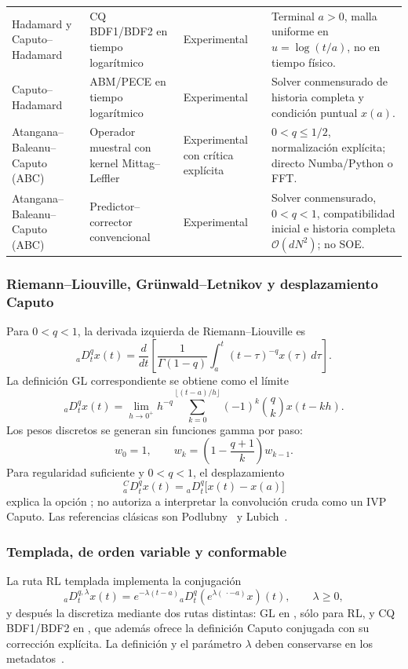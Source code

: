 \begin{center}
\begin{longtable}{@{}L{0.18\textwidth}L{0.23\textwidth}L{0.19\textwidth}L{0.29\textwidth}@{}}
Hadamard y Caputo--Hadamard & CQ BDF1/BDF2 en tiempo logarítmico & Experimental & Terminal \(a>0\), malla uniforme en \(u=\log(t/a)\), no en tiempo físico. \\
Caputo--Hadamard & ABM/PECE en tiempo logarítmico & Experimental & Solver conmensurado de historia completa y condición puntual \(x(a)\). \\
Atangana--Baleanu--Caputo (ABC) & Operador muestral con kernel Mittag--Leffler & Experimental con crítica explícita & \(0<q\le1/2\), normalización explícita; directo Numba/Python o FFT. \\
Atangana--Baleanu--Caputo (ABC) & Predictor--corrector convencional & Experimental & Solver conmensurado, \(0<q<1\), compatibilidad inicial e historia completa \(\mathcal O(dN^2)\); no SOE. \\
\bottomrule
\end{longtable}
\end{center}

\subsubsection{Riemann--Liouville, Grünwald--Letnikov y desplazamiento Caputo}

Para \(0<q<1\), la derivada izquierda de Riemann--Liouville es
\[
 {}_aD_t^q x(t)=\frac{d}{dt}
 \left[
   \frac{1}{\Gamma(1-q)}
   \int_a^t (t-\tau)^{-q}x(\tau)\,d\tau
 \right].
\]
La definición GL correspondiente se obtiene como el límite
\[
 {}_aD_t^q x(t)=\lim_{h\to0^+}h^{-q}
 \sum_{k=0}^{\lfloor (t-a)/h\rfloor}
 (-1)^k \binom{q}{k}x(t-kh).
\]
Los pesos discretos se generan sin funciones gamma por paso:
\[
 w_0=1,\qquad
 w_k=\left(1-\frac{q+1}{k}\right)w_{k-1}.
\]
Para regularidad suficiente y \(0<q<1\), el desplazamiento
\[
 {}_a^CD_t^q x(t)={}_aD_t^q\bigl[x(t)-x(a)\bigr]
\]
explica la opción ; no autoriza a interpretar la
convolución cruda como un IVP Caputo. Las referencias clásicas son
Podlubny~\cite{Podlubny1999} y Lubich~\cite{Lubich1986}.

\subsubsection{Templada, de orden variable y conformable}

La ruta RL templada implementa la conjugación
\[
 {}_aD_t^{q,\lambda}x(t)=
 e^{-\lambda(t-a)}{}_aD_t^q
 \left(e^{\lambda(\,\cdot-a)}x\right)(t),
 \qquad \lambda\ge0,
\]
y después la discretiza mediante dos rutas distintas: GL en
, sólo para RL, y CQ BDF1/BDF2
en , que además ofrece la definición
Caputo conjugada con su corrección explícita. La definición y el parámetro
\(\lambda\) deben conservarse en los metadatos~\cite{SabzikarEtAl2015}.

